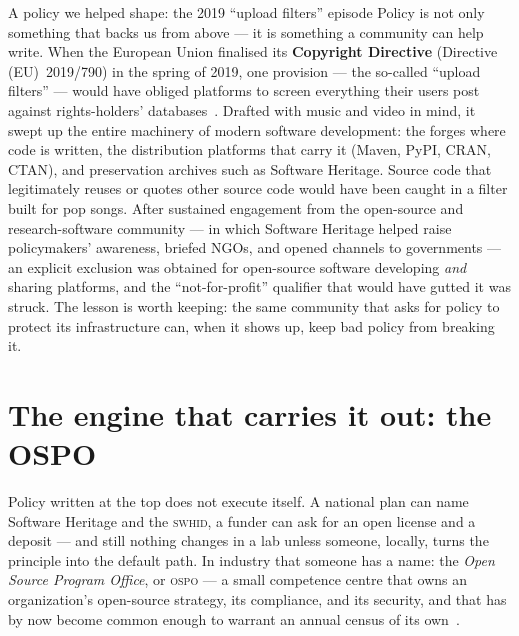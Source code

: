 \begin{callout}{A policy we helped shape: the 2019 ``upload filters'' episode}
\small
Policy is not only something that backs us from above --- it is something a community can help write.
When the European Union finalised its \textbf{Copyright Directive} (Directive (EU)~2019/790) in the
spring of 2019, one provision --- the so-called \enquote{upload filters} --- would have obliged
platforms to screen everything their users post against rights-holders'
databases~\autocite{EU_CopyrightDir2019}. Drafted with music and video in mind, it swept up the entire
machinery of modern software development: the forges where code is written, the distribution
platforms that carry it (Maven, PyPI, CRAN, CTAN), and preservation archives such as Software
Heritage. Source code that legitimately reuses or quotes other source code would have been caught in a
filter built for pop songs. After sustained engagement from the open-source and research-software
community --- in which Software Heritage helped raise policymakers' awareness, briefed NGOs, and
opened channels to governments --- an explicit exclusion was obtained for open-source software
developing \emph{and} sharing platforms, and the \enquote{not-for-profit} qualifier that would have
gutted it was struck. The lesson is worth keeping: the same community that asks for policy to protect
its infrastructure can, when it shows up, keep bad policy from breaking it.
\end{callout}

\section{The engine that carries it out: the OSPO}

Policy written at the top does not execute itself. A national plan can name Software Heritage and the
\textsc{swhid}, a funder can ask for an open license and a deposit --- and still nothing changes in a
lab unless someone, locally, turns the principle into the default path. In industry that someone has a
name: the \emph{Open Source Program Office}, or \textsc{ospo} --- a small competence centre that owns
an organization's open-source strategy, its compliance, and its security, and that has by now become
common enough to warrant an annual census of its own~\autocite{lfospo2024,todogroup_ospo}.


